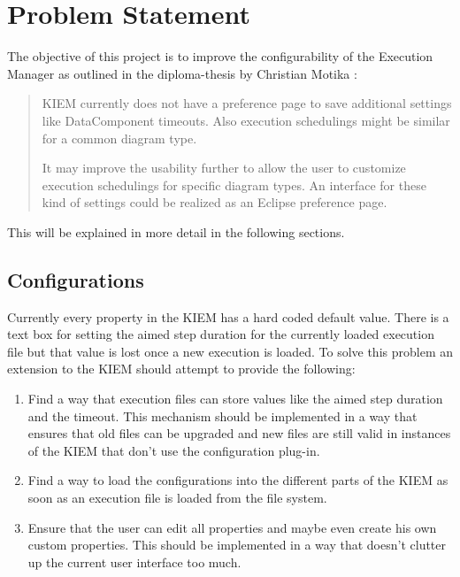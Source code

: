 \chapter{Problem Statement}
\label{chapter:ConfTask}
The objective of this project is to improve the configurability of the
Execution Manager as outlined in the diploma-thesis by Christian Motika \cite{cmot-dt}:
\begin{quote}
 \ac{KIEM} currently does not have a preference page to save
additional settings like DataComponent timeouts. Also execution schedulings
might be similar for a common diagram type.

It may improve the usability further to allow the user to customize execution
schedulings for specific diagram types. An interface for these kind of settings
could be realized as an Eclipse preference page.
\end{quote}
This will be explained in more detail in the following sections.
\section{Configurations}
Currently every property in the \ac{KIEM} has a hard coded default value. There is a text box
for setting the aimed step duration for the currently loaded execution file but that value
is lost once a new execution is loaded.
To solve this problem an extension to the \ac{KIEM} should attempt to provide the following:
\begin{enumerate}
 \item Find a way that execution files can store values like the aimed step duration and the timeout.
This mechanism should be implemented in a way that ensures that old files can be upgraded and new
files are still valid in instances of the \ac{KIEM} that don't use the configuration plug-in.
 \item Find a way to load the configurations into the different parts of the \ac{KIEM} as soon as an
execution file is loaded from the file system.
 \item Ensure that the user can edit all properties and maybe even create his own custom properties.
This should be implemented in a way that doesn't clutter up the current user interface too much.
\end{enumerate}


